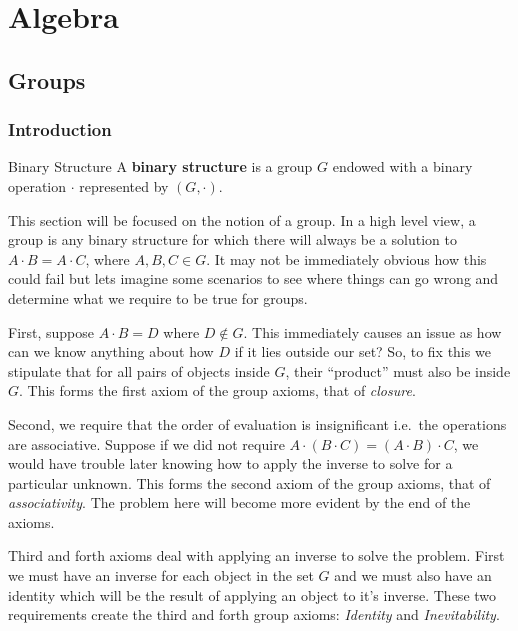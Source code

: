 \chapter{Algebra}

\section{Groups}

\subsection{Introduction}


\begin{defn}{Binary Structure}
  A \textbf{binary structure} is a group $G$ endowed with a binary operation $\cdot$ represented by $(G, \cdot)$.
\end{defn}


This section will be focused on the notion of a group.
In a high level view, a group is any binary structure for which there will always be a solution to $ A\cdot B = A\cdot C $, where $A,B,C \in G$.
It may not be immediately obvious how this could fail but lets imagine some scenarios to see where things can go wrong and determine what we require to be true for groups.

First, suppose $A\cdot B = D$ where $D \not\in G$. This immediately causes an issue as how can we know anything about how $D$ if it lies outside our set?
So, to fix this we stipulate that for all pairs of objects inside $G$, their ``product'' must also be inside $G$. 
This forms the first axiom of the group axioms, that of \emph{closure}.

Second, we require that the order of evaluation is insignificant i.e.\ the operations are associative.
Suppose if we did not require $A \cdot ( B \cdot C) = (A \cdot B) \cdot C$, we would have trouble later knowing how to apply the inverse to solve for a particular unknown.
This forms the second axiom of the group axioms, that of \emph{associativity}.
The problem here will become more evident by the end of the axioms.

Third and forth axioms deal with applying an inverse to solve the problem.
First we must have an inverse for each object in the set $G$ and we must also have an identity which will be the result of applying an object to it's inverse.
These two requirements create the third and forth group axioms: \emph{Identity} and \emph{Inevitability}.

